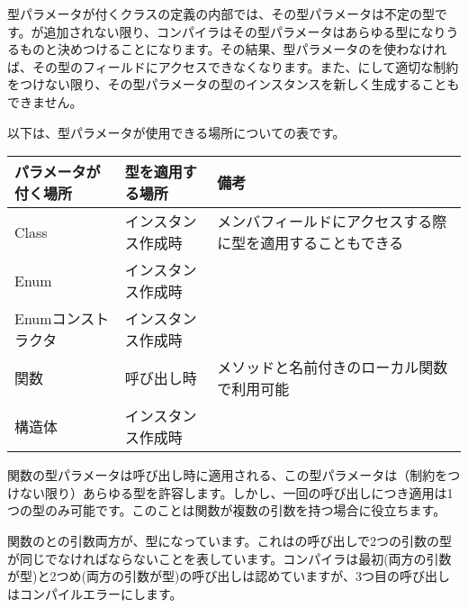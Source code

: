 型パラメータが付くクラスの定義の内部では、その型パラメータは不定の型です。が追加されない限り、コンパイラはその型パラメータはあらゆる型になりうるものと決めつけることになります。その結果、型パラメータのを使わなければ、その型のフィールドにアクセスできなくなります。また、にして適切な制約をつけない限り、その型パラメータの型のインスタンスを新しく生成することもできません。

以下は、型パラメータが使用できる場所についての表です。

\begin{center}
\begin{tabular}{| l | l | l |}
	\hline
	パラメータが付く場所 & 型を適用する場所 & 備考 \\ \hline
	Class & インスタンス作成時 & メンバフィールドにアクセスする際に型を適用することもできる \\
	Enum & インスタンス作成時 & \\
	Enumコンストラクタ & インスタンス作成時 & \\
	関数 & 呼び出し時 & メソッドと名前付きのローカル関数で利用可能	\\
	構造体 & インスタンス作成時 & \\ \hline
\end{tabular}
\end{center}

関数の型パラメータは呼び出し時に適用される、この型パラメータは（制約をつけない限り）あらゆる型を許容します。しかし、一回の呼び出しにつき適用は1つの型のみ可能です。このことは関数が複数の引数を持つ場合に役立ちます。


関数のとの引数両方が、型になっています。これはの呼び出しで2つの引数の型が同じでなければならないことを表しています。コンパイラは最初(両方の引数が型)と2つめ(両方の引数が型)の呼び出しは認めていますが、3つ目の呼び出しはコンパイルエラーにします。



